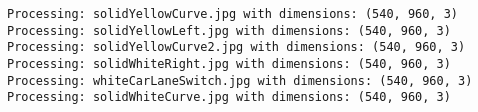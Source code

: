 \documentclass[11pt]{article}
\begin{document}
    \begin{Verbatim}[commandchars=\\\{\}]
Processing: solidYellowCurve.jpg with dimensions: (540, 960, 3)
Processing: solidYellowLeft.jpg with dimensions: (540, 960, 3)
Processing: solidYellowCurve2.jpg with dimensions: (540, 960, 3)
Processing: solidWhiteRight.jpg with dimensions: (540, 960, 3)
Processing: whiteCarLaneSwitch.jpg with dimensions: (540, 960, 3)
Processing: solidWhiteCurve.jpg with dimensions: (540, 960, 3)

    \end{Verbatim}

    \begin{center}
    \end{center}
    { \hspace*{\fill} \\}
    
    \begin{center}
    \end{center}
    { \hspace*{\fill} \\}
    
    \begin{center}
    \end{center}
    { \hspace*{\fill} \\}
    
    \begin{center}
    \end{center}
    { \hspace*{\fill} \\}
    
    \begin{center}
    \end{center}
    { \hspace*{\fill} \\}
    
    \begin{center}
    \end{center}
    { \hspace*{\fill} \\}
    
\end{document}
